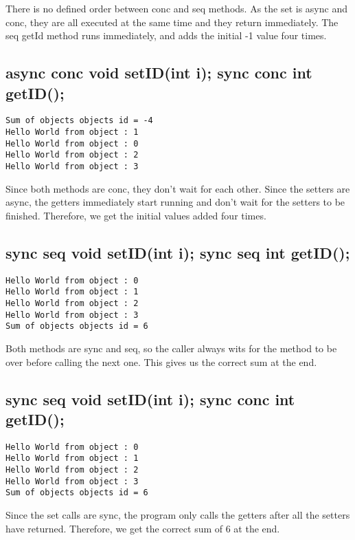 \documentclass[a4paper]{article}
\begin{document}
There is no defined order between conc and seq methods. As the set is async and conc, they are all executed at the same time and they return immediately. The seq getId method runs immediately, and adds the initial -1 value four times.


\subsection{async conc void setID(int i); sync conc int getID();}

\begin{lstlisting}
Sum of objects objects id = -4
Hello World from object : 1
Hello World from object : 0
Hello World from object : 2
Hello World from object : 3
\end{lstlisting}

Since both methods are conc, they don't wait for each other. Since the setters are async, the getters immediately start running and don't wait for the setters to be finished. Therefore, we get the initial values added four times.

\subsection{sync seq void setID(int i); sync seq int getID();}

\begin{lstlisting}
Hello World from object : 0
Hello World from object : 1
Hello World from object : 2
Hello World from object : 3
Sum of objects objects id = 6
\end{lstlisting}

Both methods are sync and seq, so the caller always wits for the method to be over before calling the next one. This gives us the correct sum at the end.

\subsection{sync seq void setID(int i); sync conc int getID();}

\begin{lstlisting}
Hello World from object : 0
Hello World from object : 1
Hello World from object : 2
Hello World from object : 3
Sum of objects objects id = 6
\end{lstlisting}

Since the set calls are sync, the program only calls the getters after all the setters have returned. Therefore, we get the correct sum of 6 at the end.
\end{document}
